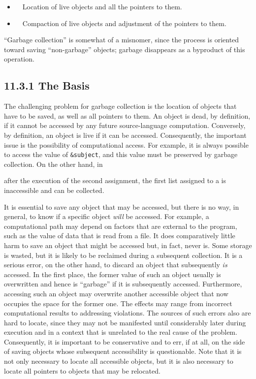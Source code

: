 \liststyleLxii
\begin{itemize}
\item 
\ \ Location of live objects and all the pointers to them.
\item 
\ \ Compaction of live objects and adjustment of the pointers to them.
\end{itemize}

``Garbage collection'' is somewhat of a misnomer, since the process is
oriented toward saving ``non-garbage'' objects; garbage disappears as
a byproduct of this operation.

\subsection[11.3.1 The Basis]{11.3.1 The Basis}

The challenging problem for garbage collection is the location of
objects that have to be saved, as well as all pointers to them. An
object is dead, by definition, if it cannot be accessed by any future
source-language computation.  Conversely, by definition, an object is
live if it can be accessed. Consequently, the important issue is the
possibility of computational access. For example, it is always
possible to access the value of \texttt{\&subject}, and this value
must be preserved by garbage collection. On the other hand, in

\goodbreak
{}

\noindent after the execution of the second assignment, the first list
assigned to a is inaccessible and can be collected.

It is essential to save any object that may be accessed, but there is
no way, in general, to know if a specific object \textit{will} be
accessed. For example, a computational path may depend on factors that
are external to the program, such as the value of data that is read
from a file. It does comparatively little harm to save an object that
might be accessed but, in fact, never is. Some storage is wasted, but
it is likely to be reclaimed during a subsequent collection. It is a
serious error, on the other hand, to discard an object that
subsequently \textit{is} accessed. In the first place, the former
value of such an object usually is overwritten and hence is
``garbage'' if it is subsequently accessed. Furthermore, accessing
such an object may overwrite another accessible object that now
occupies the space for the former one. The effects may range from
incorrect computational results to addressing violations. The sources
of such errors also are hard to locate, since they may not be
manifested until considerably later during execution and in a context
that is unrelated to the real cause of the problem. Consequently, it
is important to be conservative and to err, if at all, on the side of
saving objects whose subsequent accessibility is questionable. Note
that it is not only necessary to locate all accessible objects, but it
is also necessary to locate all pointers to objects that may be
relocated.

